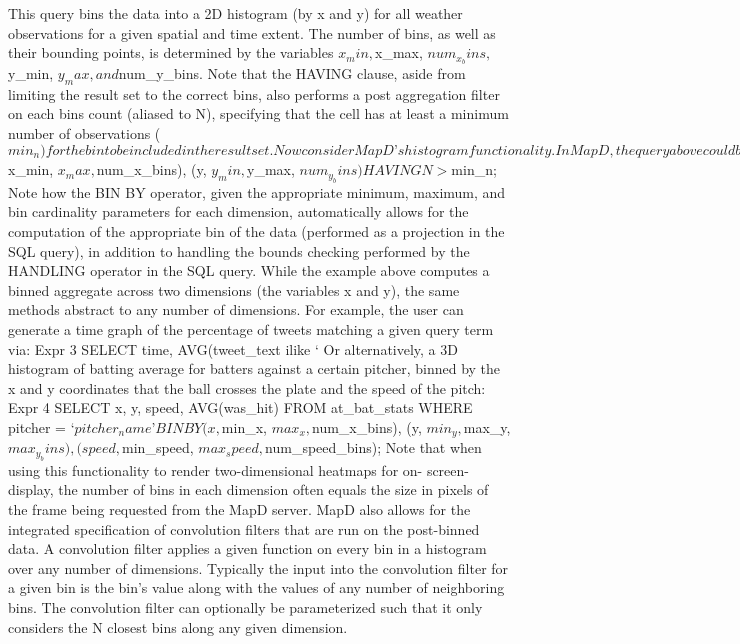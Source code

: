 \documentclass[twocolumn]{article}
\begin{document}
This query bins the data into a 2D histogram (by x and y) for all weather observations for a given spatial and time extent. The number of bins, as well as their bounding points, is determined by the variables $x_min, $x_max, $num_x_bins, $y_min, $y_max, and $num_y_bins. Note that the HAVING clause, aside from limiting the result set to the correct bins, also performs a post aggregation filter on each bins count (aliased to N), specifying that the cell has at least a minimum number of observations ($min_n) for the bin to be included in the result set.
Now consider MapD’s histogram functionality. In MapD, the query above could be expressed as:
Expr 2
SELECT x, y, COUNT(*) as N, AVG(temp) as avg_temp FROM weather WHERE date >= ‘2012-07-01’ AND date <= ‘2012-07-07’ BIN BY (x, $x_min, $x_max, $num_x_bins), (y, $y_min, $y_max, $num_y_bins) HAVING N > $min_n;
Note how the BIN BY operator, given the appropriate minimum, maximum, and bin cardinality parameters for each dimension, automatically allows for the computation of the appropriate bin of the data (performed as a projection in the SQL query), in addition to handling the bounds checking performed by the HANDLING operator in the SQL query.
While the example above computes a binned aggregate across two dimensions (the variables x and y), the same methods abstract to any number of dimensions. For example, the user can generate a time graph of the percentage of tweets matching a given query term via:
Expr 3
SELECT time, AVG(tweet_text ilike ‘%
Or alternatively, a 3D histogram of batting average for batters against a certain pitcher, binned by the x and y coordinates that the ball crosses the plate and the speed of the pitch:
Expr 4
SELECT x, y, speed, AVG(was_hit) FROM at_bat_stats WHERE pitcher = ‘$pitcher_name’ BIN BY (x, $min_x, $max_x, $num_x_bins), (y, $min_y, $max_y, $max_y_bins), (speed, $min_speed, $max_speed, $num_speed_bins);
Note that when using this functionality to render two-dimensional heatmaps for on- screen-display, the number of bins in each dimension often equals the size in pixels of the frame being requested from the MapD server.
MapD also allows for the integrated specification of convolution filters that are run on the post-binned data. A convolution filter applies a given function on every bin in a histogram over any number of dimensions. Typically the input into the convolution filter for a given bin is the bin’s value along with the values of any number of neighboring bins. The convolution filter can optionally be parameterized such that it only considers the N closest bins along any given dimension.
\end{document}
